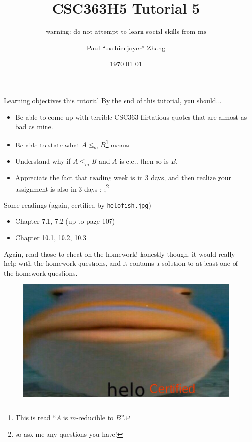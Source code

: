 \documentclass{beamer}
\title{CSC363H5 Tutorial 5}
\subtitle{warning: do not attempt to learn social skills from me}
\date{\today}
\author{Paul ``sushi{\textunderscore}enjoyer'' Zhang}
\institute{University of Chungi (in polar coordinates)}
\begin{document}
\maketitle

\begin{frame}{Learning objectives this tutorial}
By the end of this tutorial, you should...
\begin{itemize}
\item Be able to come up with terrible CSC363 flirtatious quotes that are almost as bad as mine.
\item Be able to state what $A \leq_m B$\footnote{This is read ``$A$ is $m$-reducible to $B$''.} means. 
\item Understand why if $A \leq_m B$ and $A$ is c.e., then so is $B$.
\item Appreciate the fact that reading week is in 3 days, and then realize your assignment is also in 3 days ;-;\footnote{so ask me any questions you have!}
\end{itemize}
\end{frame}

\begin{frame}{Some readings (again, certified by \texttt{helo\textunderscore fish.jpg})}
\begin{itemize}
\item Chapter 7.1, 7.2 (up to page 107)
\item Chapter 10.1, 10.2, 10.3
\end{itemize}
Again, read those to cheat on the homework! honestly though, it would really help with the homework questions, and it contains a solution to at least one of the homework questions.
\begin{figure}[h]
\includegraphics[scale=0.3]{img/helo_fish_certified.jpg}
\end{figure}
\end{frame}
\end{document}
